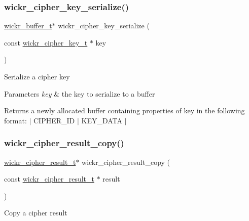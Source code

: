 \subsubsection{\texorpdfstring{wickr\+\_\+cipher\+\_\+key\+\_\+serialize()}{wickr\_cipher\_key\_serialize()}}
{\footnotesize\ttfamily \mbox{\hyperlink{structwickr__buffer}{wickr\+\_\+buffer\+\_\+t}}$\ast$ wickr\+\_\+cipher\+\_\+key\+\_\+serialize (\begin{DoxyParamCaption}\item[{const \mbox{\hyperlink{structwickr__cipher__key}{wickr\+\_\+cipher\+\_\+key\+\_\+t}} $\ast$}]{key }\end{DoxyParamCaption})}

Serialize a cipher key


\begin{DoxyParams}{Parameters}
{\em key} & the key to serialize to a buffer \\
\hline
\end{DoxyParams}
\begin{DoxyReturn}{Returns}
a newly allocated buffer containing properties of \textquotesingle{}key\textquotesingle{} in the following format\+: $\vert$ C\+I\+P\+H\+E\+R\+\_\+\+ID $\vert$ K\+E\+Y\+\_\+\+D\+A\+TA $\vert$ 
\end{DoxyReturn}
\mbox{\label{group__wickr__cipher_gace82050fcc8b7932df9a9e8109a2fc1d}} 
\subsubsection{\texorpdfstring{wickr\+\_\+cipher\+\_\+result\+\_\+copy()}{wickr\_cipher\_result\_copy()}}
{\footnotesize\ttfamily \mbox{\hyperlink{structwickr__cipher__result}{wickr\+\_\+cipher\+\_\+result\+\_\+t}}$\ast$ wickr\+\_\+cipher\+\_\+result\+\_\+copy (\begin{DoxyParamCaption}\item[{const \mbox{\hyperlink{structwickr__cipher__result}{wickr\+\_\+cipher\+\_\+result\+\_\+t}} $\ast$}]{result }\end{DoxyParamCaption})}

Copy a cipher result


